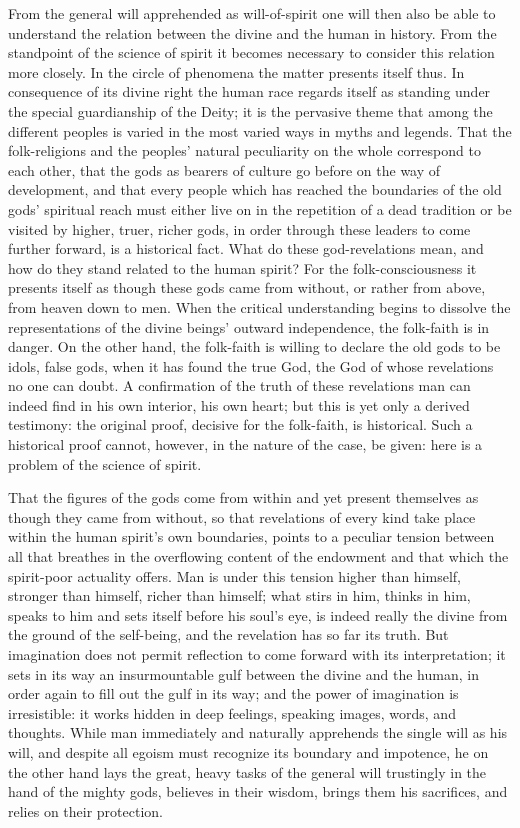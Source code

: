 \documentclass[12pt]{book}
\begin{document}
From the general will apprehended as will-of-spirit one will then also be able to understand the
relation between the divine and the human in history. From the standpoint of the science of spirit
it becomes necessary to consider this relation more closely. In the circle of phenomena the matter
presents itself thus. In consequence of its divine right the human race regards itself as standing
under the special guardianship of the Deity; it is the pervasive theme that among the different
peoples is varied in the most varied ways in myths and legends. That the folk-religions and the
peoples' natural peculiarity on the whole correspond to each other, that the gods as bearers of
culture go before on the way of development, and that every people which has reached the boundaries
of the old gods' spiritual reach must either live on in the repetition of a dead tradition or be
visited by higher, truer, richer gods, in order through these leaders to come further forward, is
a historical fact. What do these god-revelations mean, and how do they stand related to the human
spirit? For the folk-consciousness it presents itself as though these gods came from without, or
rather from above, from heaven down to men. When the critical understanding begins to dissolve the
representations of the divine beings' outward independence, the folk-faith is in danger. On the
other hand, the folk-faith is willing to declare the old gods to be idols, false gods, when it has
found the true God, the God of whose revelations no one can doubt. A confirmation of the truth of
these revelations man can indeed find in his own interior, his own heart; but this is yet only a
derived testimony: the original proof, decisive for the folk-faith, is historical. Such a
historical proof cannot, however, in the nature of the case, be given: here is a problem of the
science of spirit.

That the figures of the gods come from within and yet present themselves as though they came from
without, so that revelations of every kind take place within the human spirit's own boundaries,
points to a peculiar tension between all that breathes in the overflowing content of the endowment
and that which the spirit-poor actuality offers. Man is under this tension higher than himself,
stronger than himself, richer than himself; what stirs in him, thinks in him, speaks to him and sets
itself before his soul's eye, is indeed really the divine from the ground of the self-being, and the
revelation has so far its truth. But imagination does not permit reflection to come forward with its
interpretation; it sets in its way an insurmountable gulf between the divine and the human, in order
again to fill out the gulf in its way; and the power of imagination is irresistible: it works hidden
in deep feelings, speaking images, words, and thoughts. While man immediately and naturally
apprehends the single will as his will, and despite all egoism must recognize its boundary and
impotence, he on the other hand lays the great, heavy tasks of the general will trustingly in the
hand of the mighty gods, believes in their wisdom, brings them his sacrifices, and relies on their
protection.
\end{document}
